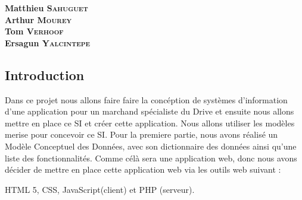 \documentclass[12pt]{report}
\newcommand{\blankpage}{
\newpage
\thispagestyle{empty}
\mbox{}
\newpage
}
\begin{document}
\blankpage



\begin{titlepage}
\ladonetTitlePage{}
\begin{center}
\vfill
\large{\textbf{Matthieu \textsc{Sahuguet}}}\\
\large{\textbf{Arthur \textsc{Mourey}}}\\
\large{\textbf{Tom \textsc{Verhoof}}}\\
\large{\textbf{Ersagun \textsc{Yalcintepe}}}\\
\vfill

\end{center}
\end{titlepage}


\begin{spacing}{1.2}

\setlength{\parskip}{16pt}

\setcounter{page}{2}

\tableofcontents





\chapter{Introduction}

Dans ce projet nous allons faire faire la concéption de systèmes d'information d'une application pour un marchand spécialiste du Drive et ensuite nous allons mettre en place ce SI et créer cette application. Nous allons utiliser les modèles merise pour concevoir ce SI. Pour la premiere partie, nous avons réalisé un Modèle Conceptuel des Données, avec son dictionnaire des
données ainsi qu’une liste des fonctionnalités. Comme célà sera une application web, donc nous avons décider de mettre en place cette application web via les outils web suivant :

HTML 5, CSS, JavaScript(client) et PHP (serveur).


\end{spacing}
\end{document}
